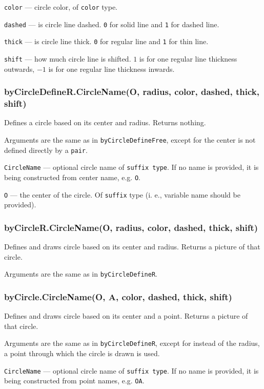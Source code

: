\documentclass{ltxdoc}
\begin{document}
\texttt{color} — circle color, of \texttt{color} type.

\texttt{dashed} — is circle line dashed. \texttt{0} for solid line and \texttt{1} for dashed line.

\texttt{thick} — is circle line thick. \texttt{0} for regular line and \texttt{1} for thin line.

\texttt{shift} — how much circle line is shifted. \texttt{$1$} is for one regular line thickness outwards, \texttt{$-1$} is for one regular line thickness inwards.


\subsubsection{byCircleDefineR.CircleName(O, radius, color, dashed, thick, shift)}

Defines a circle based on its center and radius. Returns nothing.

Arguments are the same as in \texttt{byCircleDefineFree}, except for the center is not defined directly by a \texttt{pair}.

\texttt{CircleName} — optional circle name of \texttt{suffix type}. If no name is provided, it is being constructed from center name, e.g. \texttt{O}.

\texttt{O} — the center of the circle. Of \texttt{suffix} type (i. e., variable name should be provided).

\subsubsection{byCircleR.CircleName(O, radius, color, dashed, thick, shift)}

Defines and draws circle based on its center and radius. Returns a picture of that circle.

Arguments are the same as in \texttt{byCircleDefineR}.

\subsubsection{byCircle.CircleName(O, A, color, dashed, thick, shift)}

Defines and draws circle based on its center and a point. Returns a picture of that circle.

Arguments are the same as in \texttt{byCircleDefineR}, except for instead of the radius, a point through which the circle is drawn is used.

\texttt{CircleName} — optional circle name of \texttt{suffix type}. If no name is provided, it is being constructed from point names, e.g. \texttt{OA}.
\end{document}
